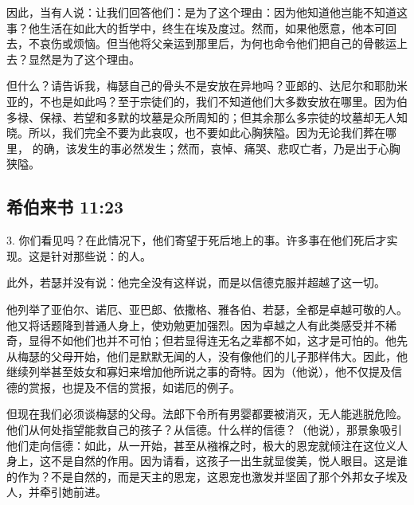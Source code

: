 因此，当有人说：让我们回答他们：是为了这个理由：因为他知道他岂能不知道这事？他生活在如此大的哲学中，终生在埃及度过。然而，如果他愿意，他本可回去，不哀伤或烦恼。但当他将父亲运到那里后，为何也命令他们把自己的骨骸运上去？显然是为了这个理由。\par

但什么？请告诉我，梅瑟自己的骨头不是安放在异地吗？亚郎的、达尼尔和耶肋米亚的，不也是如此吗？至于宗徒们的，我们不知道他们大多数安放在哪里。因为伯多禄、保禄、若望和多默的坟墓是众所周知的；但其余那么多宗徒的坟墓却无人知晓。所以，我们完全不要为此哀叹，也不要如此心胸狭隘。因为无论我们葬在哪里，  的确，该发生的事必然发生；然而，哀悼、痛哭、悲叹亡者，乃是出于心胸狭隘。\par


\subsection{希伯来书 11:23}

3.   你们看见吗？在此情况下，他们寄望于死后地上的事。许多事在他们死后才实现。这是针对那些说：的人。\par

此外，若瑟并没有说：他完全没有这样说，而是以信德克服并超越了这一切。\par

他列举了亚伯尔、诺厄、亚巴郎、依撒格、雅各伯、若瑟，全都是卓越可敬的人。他又将话题降到普通人身上，使劝勉更加强烈。因为卓越之人有此类感受并不稀奇，显得不如他们也并不可怕；但若显得连无名之辈都不如，这才是可怕的。他先从梅瑟的父母开始，他们是默默无闻的人，没有像他们的儿子那样伟大。因此，他继续列举甚至妓女和寡妇来增加他所说之事的奇特。因为（他说），他不仅提及信德的赏报，也提及不信的赏报，如诺厄的例子。\par

但现在我们必须谈梅瑟的父母。法郎下令所有男婴都要被消灭，无人能逃脱危险。他们从何处指望能救自己的孩子？从信德。什么样的信德？（他说），那景象吸引他们走向信德：如此，从一开始，甚至从襁褓之时，极大的恩宠就倾注在这位义人身上，这不是自然的作用。因为请看，这孩子一出生就显俊美，悦人眼目。这是谁的作为？不是自然的，而是天主的恩宠，这恩宠也激发并坚固了那个外邦女子埃及人，并牵引她前进。\par


